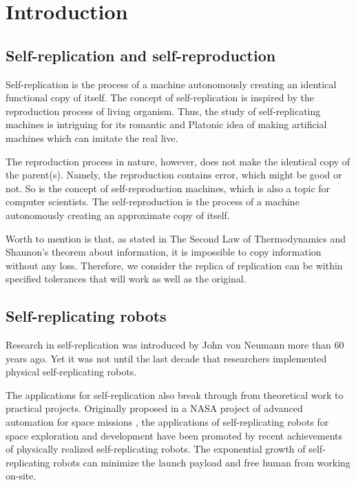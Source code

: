 \documentclass[12pt,twoside]{article}
\theoremstyle{plain}
\theoremstyle{definition}
\theoremstyle{remark}
\begin{document}
\tableofcontents
{}
\clearpage



\section{Introduction}
\label{sec:intro}

\subsection{Self-replication and self-reproduction}
Self-replication is the process of a machine autonomously creating an identical functional copy of itself. The concept of self-replication is inspired by the reproduction process of living organism. Thus, the study of self-replicating machines is intriguing for its romantic and Platonic idea of making artificial machines which can imitate the real live.

The reproduction process in nature, however, does not make the identical copy of the parent(s). Namely, the reproduction contains error, which might be good or not. So is the concept of self-reproduction machines, which is also a topic for computer scientists. The self-reproduction is the process of a machine autonomously creating an approximate copy of itself.

Worth to mention is that, as stated in The Second Law of Thermodynamics and Shannon's theorem about information, it is impossible to copy information without any loss. Therefore, we consider the replica of replication can be within specified tolerances that
will work as well as the original\cite{jones_reprap_2011}.

\subsection{Self-replicating robots}
Research in self-replication was introduced by John von Neumann\cite{von_neumann_theory_1962} more than 60 years ago. Yet it was not until the last decade that researchers implemented physical self-replicating robots\cite{suthakorn_autonomous_2003}. 

The applications for self-replication also break through from theoretical work to practical projects. Originally proposed in a NASA project of advanced automation for space missions \cite{freitas_report_1981}, the applications of self-replicating robots for space exploration and development have been promoted by recent achievements of physically realized self-replicating robots\cite{chirikjian_self-replicating_2002}. The exponential growth of self-replicating robots can minimize the launch payload and free human from working on-site.
\end{document}
